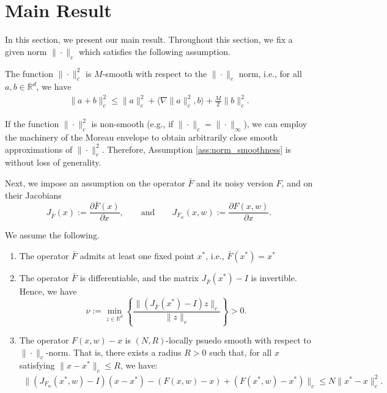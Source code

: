 \documentclass[letterpaper, 10 pt]{article}
\begin{document}
\section{Main Result}\label{sec:main_result}

In this section, we present our main result. Throughout this section, we fix a given norm $\|\cdot\|_c$ which satisfies the following assumption.

\begin{assumption}\label{ass:norm_smoothness}
    The function $\|\cdot\|_c^2$ is $M$-smooth with respect to the $\|\cdot\|_c$ norm, i.e., for all $a,b\in\mathbb{R}^d$, we have
    \begin{align*}
        \|a+b\|_c^2 \leq \|a\|_c^2 + \langle \nabla \|a\|_c^2,b\rangle + \frac{M}{2}\|b\|_c^2.
    \end{align*}
\end{assumption}

\begin{remark}
    If the function $\|\cdot\|_c^2$ is non-smooth (e.g., if $\|\cdot\|_c=\|\cdot\|_\infty$), we can employ the machinery of the Moreau envelope \cite{chen2020finite} to obtain arbitrarily close smooth approximations of $\|\cdot\|_c^2$. Therefore, Assumption \ref{ass:norm_smoothness} is without loss of generality.
\end{remark}

Next, we impose an assumption on the operator $\bar{F}$ and its noisy version $F$, and on their Jacobians
\[ J_{\bar{F}}(x) := \frac{\partial \bar{F}(x)}{\partial x}, \qquad \text{and} \qquad J_{F_w}(x,w):=\frac{\partial F(x,w)}{\partial x}. \]

\begin{assumption}\label{ass:operators}
We assume the following.
\begin{enumerate}[label={\textbf{(\roman*):}},
  ref={~\theassumption(\roman*)}]
    \item\label{ass:op_i} The operator $\bar{F}$ admits at least one fixed point $x^*$, i.e., $\bar{F}(x^*) = x^*$
    \item\label{ass:op_ii} The operator $\bar{F}$ is differentiable, and the matrix $J_{\bar{F}}(x^*)-I$ is invertible. Hence, we have
    \[ \nu := \min_{z\in\mathbb{R}^d} \left\{\frac{\|(J_{\bar{F}}(x^*)-I)z\|_c}{\|z\|_c} \right\} >0. \]
    \item\label{ass:op_iii} The operator $F(x,w)-x$ is $(N,R)$-locally psuedo smooth with respect to $\|\cdot\|_c$-norm. That is, there exists a radius $R > 0$ such that, for all $x$ satisfying $\|x - x^*\|_c \leq R$, we have:
    \begin{align*}
        \|(J_{F_w} (x^*,w)-I)(x-x^*)-(F(x,w)-x) + (F(x^*,w)-x^*)\|_c\leq N\|x^*-x\|_c^2.
    \end{align*}
\end{enumerate}
\end{assumption}
\end{document}
